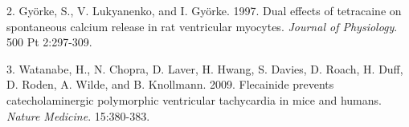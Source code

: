 \documentclass[a0]{a0poster}
\begin{document}
\begin{textblock}{7.4}
2.  Gy{\"o}rke, S., V. Lukyanenko, and I. Gy{\"o}rke. 1997. Dual effects of tetracaine on spontaneous calcium release in rat ventricular myocytes. \textit{Journal of Physiology}. 500 Pt 2:297-309.

3.  Watanabe, H., N. Chopra, D. Laver, H. Hwang, S. Davies, D. Roach, H. Duff, D. Roden, A. Wilde, and B. Knollmann. 2009. Flecainide prevents catecholaminergic polymorphic ventricular tachycardia in mice and humans. \textit{Nature Medicine}. 15:380-383.

\end{textblock}
\end{document}
